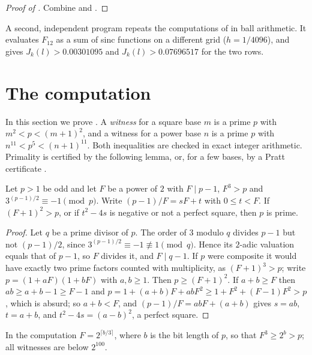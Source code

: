 \documentclass[11pt,colorlinks]{charlie}
\begin{document}
\begin{proof}[Proof of ]
Combine  and .
\end{proof}

\begin{remark}
A second, independent program repeats the computations of  in ball arithmetic. It evaluates $F_{12}$ as a sum of sinc functions on a different grid ($h=1/4096$), and gives $J_k(l)>0.00301095$ and $J_k(l)>0.07696517$ for the two rows.
\end{remark}

\section{The computation}\label{sec:sweep}
In this section we prove . A \emph{witness} for a square base $m$ is a prime $p$ with $m^2<p<(m+1)^2$, and a witness for a power base $n$ is a prime $p$ with $n^{11}<p^5<(n+1)^{11}$. Both inequalities are checked in exact integer arithmetic. Primality is certified by the following lemma, or, for a few bases, by a Pratt certificate \cite{Pratt}.

\begin{lemma}\label{lem:bls}
Let $p>1$ be odd and let $F$ be a power of $2$ with $F\mid p-1$, $F^3>p$ and $3^{(p-1)/2}\equiv-1\pmod p$. Write $(p-1)/F=sF+t$ with $0\le t<F$. If $(F+1)^2>p$, or if $t^2-4s$ is negative or not a perfect square, then $p$ is prime.
\end{lemma}
\begin{proof}
Let $q$ be a prime divisor of $p$. The order of $3$ modulo $q$ divides $p-1$ but not $(p-1)/2$, since $3^{(p-1)/2}\equiv-1\not\equiv1\pmod q$. Hence its $2$-adic valuation equals that of $p-1$, so $F$ divides it, and $F\mid q-1$. If $p$ were composite it would have exactly two prime factors counted with multiplicity, as $(F+1)^3>p$; write $p=(1+aF)(1+bF)$ with $a,b\ge1$. Then $p\ge(F+1)^2$. If $a+b\ge F$ then $ab\ge a+b-1\ge F-1$ and $p=1+(a+b)F+abF^2\ge1+F^2+(F-1)F^2>p$, which is absurd; so $a+b<F$, and $(p-1)/F=abF+(a+b)$ gives $s=ab$, $t=a+b$, and $t^2-4s=(a-b)^2$, a perfect square.
\end{proof}

In the computation $F=2^{\lceil b/3\rceil}$, where $b$ is the bit length of $p$, so that $F^3\ge2^b>p$; all witnesses are below $2^{100}$.
\end{document}
